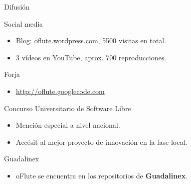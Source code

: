 \begin{frame}{Difusión}
  \begin{block}{Social media}
    \begin{itemize}
    \item Blog: \url{oflute.wordpress.com}, 5500 visitas en total.
    \item 3 vídeos en YouTube, aprox. 700 reproducciones.
    \end{itemize}    
  \end{block}

  \pause

  \begin{block}{Forja}
    \begin{itemize}
    \item \url{http://oflute.googlecode.com}
    \end{itemize}
  \end{block}

  \begin{block}{Concurso Universitario de Software Libre}
    \begin{itemize}
    \item Mención especial a nivel nacional.
    \item Accésit al mejor proyecto de innovación en la fase local.
    \end{itemize}
  \end{block}
  
  \pause

  \begin{block}{Guadalinex}
    \begin{itemize}
    \item oFlute se encuentra  en los repositorios de \textbf{Guadalinex}.
    \end{itemize}
  \end{block}
\end{frame}
